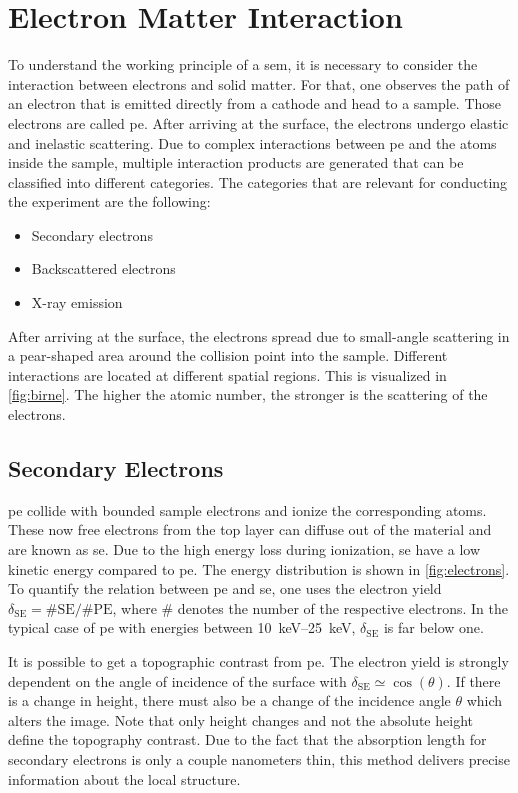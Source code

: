 \section{Electron Matter Interaction}
To understand the working principle of a \ac{sem}, it is necessary to consider the
interaction between electrons and solid matter.
For that, one observes the path of an electron that is emitted
directly from a cathode
and head to a sample. Those electrons are called \ac{pe}.
After arriving at the surface, the electrons undergo elastic and inelastic scattering.
Due to complex interactions between \ac{pe} and the atoms
inside the sample, multiple interaction products are generated that can
be classified into different categories.
The categories that are relevant for conducting the experiment are the
following:
\begin{itemize}
	\item Secondary electrons
	\item Backscattered electrons
	\item X-ray emission
\end{itemize}
After arriving at the surface, the electrons spread due to
small-angle scattering in a pear-shaped area around the collision point
into the sample.
Different interactions are located at different spatial regions.
This is visualized in \cref{fig:birne}.
The higher the atomic number, the stronger is the scattering of the
electrons.

\subsection{Secondary Electrons}
\ac{pe} collide with bounded sample electrons and ionize the
corresponding atoms.
These now free electrons from the top layer can diffuse out of the
material and are known as \ac{se}.
Due to the high energy loss during ionization, \ac{se}
have a low kinetic energy compared to \ac{pe}.
The energy distribution is shown in \cref{fig:electrons}.
To quantify the relation between \ac{pe} and \ac{se}, one
uses the electron yield $\delta_\mathrm{SE} = \text{\# SE} /
	\text{\# PE}$, where $\#$ denotes the number of the respective electrons.
In the typical case of \ac{pe} with energies between
\qtyrange{10}{25}{\kilo\electronvolt}, $\delta_\text{SE}$ is far
below one.

It is possible to get a topographic contrast from \ac{pe}.
The electron yield is strongly dependent on the angle of incidence of
the surface with $\delta_\mathrm{SE} \simeq \cos(\theta)$.
If there is a change in height, there must also be a change of the
incidence angle $\theta$ which alters the image.
Note that only height changes and not the absolute height define the
topography contrast.
Due to the fact that the absorption length for secondary electrons is
only a couple nanometers thin, this method delivers precise information
about the local structure.

